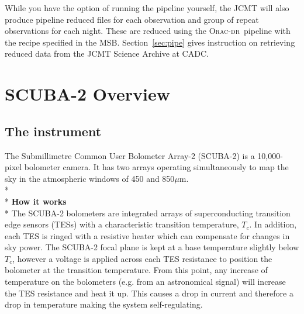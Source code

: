 \documentclass[twoside,11pt]{article}
\newcommand{\htmladdnormallink}[2]{#1}
\newcommand{\htmlref}[2]{#1}
\newcommand{\latexhtml}[2]{#1}
\newcommand{\xlabel}[1]{}
\renewcommand{\_}{\texttt{\symbol{95}}}
\newcommand{\oracdr}{\htmladdnormallink{\textsc{Orac-dr}}{http://www.oracdr.org/oracdr}}
\newcommand{\cref}[3]{\latexhtml{#1~\ref{#2}}{\htmlref{#3}{#2}}}
\begin{document}
While you have the option of running the pipeline yourself, the JCMT
will also produce pipeline reduced files for each observation and
group of repeat observations for each night. These are reduced using
the \oracdr\ pipeline with the recipe specified in the MSB.
\cref{Section}{sec:pipe}{SCUBA-2 Pipeline} gives instruction on
retrieving reduced data from the
\htmladdnormallink{JCMT Science Archive}{http://www3.cadc-ccda.hia-iha.nrc-cnrc.gc.ca/jcmt/}
at CADC.


\clearpage
\section{\xlabel{scuba2_overview}SCUBA-2 Overview}
\label{sec:s2}
\subsection{\xlabel{scuba2}The instrument}


The Submillimetre Common User Bolometer Array-2 (SCUBA-2) is a
10,000-pixel bolometer camera. It has two arrays operating simultaneously to map
the sky in the atmospheric windows of 450 and 850$\mu$m.
\\*\\*
\textbf{How it works}\\*
The SCUBA-2 bolometers are integrated arrays of superconducting
transition edge sensors (TESs) with a characteristic transition
temperature, $T_c$. In addition, each TES is ringed with a resistive
heater which can compensate for changes in sky power. The SCUBA-2
focal plane is kept at a base temperature slightly below $T_c$,
however a voltage is applied across each TES resistance to position
the bolometer at the transition temperature. From this point, any
increase of temperature on the bolometers (e.g. from an astronomical
signal) will increase the TES resistance and heat it up. This causes a
drop in current and therefore a drop in temperature making the system
self-regulating.
\end{document}
